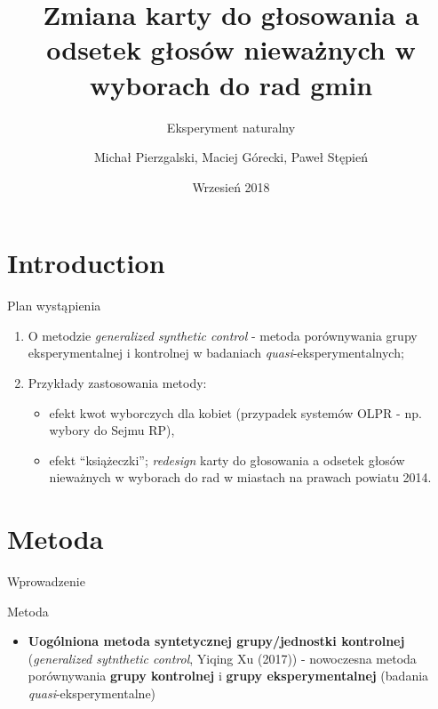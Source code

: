 \documentclass[12pt]{beamer}
\title{Zmiana karty do głosowania a odsetek głosów
nieważnych w wyborach do rad gmin}
\subtitle{Eksperyment naturalny}
\author{Michał Pierzgalski, Maciej Górecki, Paweł Stępień}
\institute{Uniwersytet Łódzki, Uniwersytet Warszawski}
\date{Wrzesień 2018}
\begin{document}
\begin{frame}
  \titlepage
\end{frame}


\section{Introduction}


\begin{frame}{Plan wystąpienia}
    
\begin{enumerate}
\item O metodzie \textit{generalized synthetic control} - metoda porównywania grupy eksperymentalnej i kontrolnej w badaniach \textit{quasi}-eksperymentalnych;
\item Przykłady zastosowania metody:
\begin{itemize}
\item efekt kwot wyborczych dla kobiet (przypadek systemów OLPR - np. wybory do Sejmu RP),
\item efekt ``książeczki''; \textit{redesign} karty do głosowania a odsetek głosów nieważnych w wyborach do rad w miastach na prawach powiatu 2014.
\end{itemize}
\end{enumerate}

\end{frame}

\section{Metoda}


\begin{frame}{Wprowadzenie}

\begin{block}{Metoda}
\begin{itemize}
\item \textbf{Uogólniona metoda syntetycznej grupy/jednostki kontrolnej} (\textit{generalized sytnthetic control}, Yiqing Xu (2017)) - nowoczesna metoda porównywania \textbf{grupy kontrolnej} i \textbf{grupy eksperymentalnej} (badania \textit{quasi}-eksperymentalne)
\end{itemize}
\end{block}

\end{frame}
\end{document}
